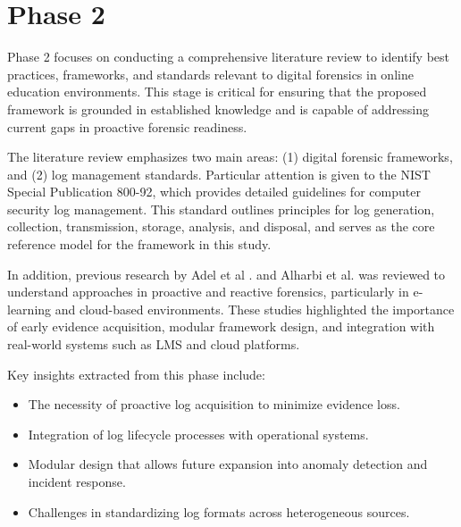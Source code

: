 \section{Phase 2}
Phase 2 focuses on conducting a comprehensive literature review to identify best practices, frameworks, and standards relevant to digital forensics in online education environments. This stage is critical for ensuring that the proposed framework is grounded in established knowledge and is capable of addressing current gaps in proactive forensic readiness.

The literature review emphasizes two main areas: (1) digital forensic frameworks, and (2) log management standards. Particular attention is given to the NIST Special Publication 800-92, which provides detailed guidelines for computer security log management. This standard outlines principles for log generation, collection, transmission, storage, analysis, and disposal, and serves as the core reference model for the framework in this study.

In addition, previous research by Adel et al \cite{adel2024ethicore}. and Alharbi et al\cite{proactiveandreactivedigitalforensics}. was reviewed to understand approaches in proactive and reactive forensics, particularly in e-learning and cloud-based environments. These studies highlighted the importance of early evidence acquisition, modular framework design, and integration with real-world systems such as LMS and cloud platforms.

Key insights extracted from this phase include:

\begin{itemize}
	\item The necessity of proactive log acquisition to minimize evidence loss.
	\item Integration of log lifecycle processes with operational systems.
	\item Modular design that allows future expansion into anomaly detection and incident response.
	\item Challenges in standardizing log formats across heterogeneous sources.
\end{itemize}

